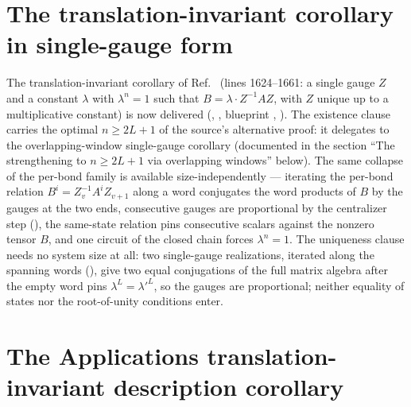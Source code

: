 \documentclass{article}
\begin{document}
\section*{The translation-invariant corollary in single-gauge form}

The translation-invariant corollary of Ref.~\cite{Molnar2018NormalPEPS}
(lines 1624--1661: a single gauge $Z$
and a constant $\lambda$ with $\lambda^n = 1$ such that
$B = \lambda \cdot Z^{-1} A Z$, with $Z$ unique up to a multiplicative
constant) is now delivered
(,
,
blueprint ,
).
The existence clause carries the optimal $n \ge 2L + 1$ of the source's
alternative proof: it delegates to the overlapping-window single-gauge
corollary 
(documented in the section ``The strengthening to $n \ge 2L+1$ via
overlapping windows'' below).  The same collapse of the per-bond family is
available size-independently — iterating the per-bond relation
$B^i = Z_v^{-1} A^i Z_{v+1}$ along a word conjugates the word products of
$B$ by the gauges at the two ends, consecutive gauges are proportional by
the centralizer step (), the same-state
relation pins consecutive scalars against the nonzero tensor $B$, and one
circuit of the closed chain forces $\lambda^n = 1$.  The uniqueness clause
needs no system size at all: two single-gauge realizations, iterated along
the spanning words (), give two equal
conjugations of the full matrix algebra after the empty word pins
$\lambda^L = \lambda'^L$, so the gauges are proportional; neither equality
of states nor the root-of-unity conditions enter.

\section*{The Applications translation-invariant description corollary}
\end{document}
